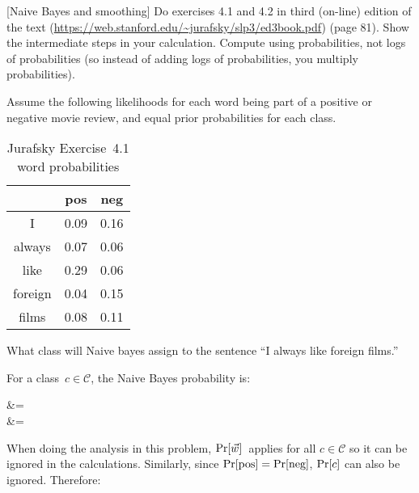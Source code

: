 \begin{problem}
   \textnormal{[Naive Bayes and smoothing]} Do exercises 4.1 and 4.2 in third (on-line) edition of the text (\url{https://web.stanford.edu/~jurafsky/slp3/ed3book.pdf}) (page 81). Show the intermediate steps in your calculation. Compute using probabilities, not logs of probabilities (so instead of adding logs of probabilities, you multiply probabilities).
\end{problem}

\begin{subproblem}\label{P02:A}
  Assume the following likelihoods for each word being part of a positive or negative movie review, and equal prior probabilities for each class.

  \begin{table}[h]
    \centering
    \caption{Jurafsky Exercise~4.1 word probabilities}\label{tab:}
    \begin{tabular}{ccc}
              & pos  & neg \\\hline
      I       & 0.09 & 0.16 \\
      always  & 0.07 & 0.06 \\
      like    & 0.29 & 0.06 \\
      foreign & 0.04 & 0.15 \\
      films   & 0.08 & 0.11 \\
    \end{tabular}
  \end{table}

  What  class  will  Naive  bayes  assign  to  the  sentence  ``I  always  like  foreign films.''
\end{subproblem}

For a class~${c \in \mathcal{C}}$, the Naive Bayes probability is:

\begin{aligncustom}
  \Pr {} &=  \\
                               &= 
\end{aligncustom}

\noindent
When doing the analysis in this problem, ${\Pr\lbrack\vec{w}\rbrack}$~applies for all ${c \in \mathcal{C}}$ so it can be ignored in the calculations.  Similarly, since ${\Pr\lbrack\text{pos}\rbrack = \Pr\lbrack\text{neg}\rbrack}$, ${\Pr\lbrack c\rbrack}$ can also be ignored.  Therefore:

